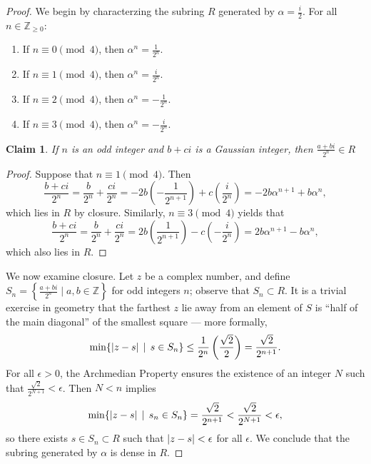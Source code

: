 \documentclass[11pt]{article}
\newtheorem{claim}{Claim}
\begin{document}
\begin{proof} 
  We begin by characterzing the subring $R$ generated by $\alpha = \tfrac{i}{2}$. For all $n \in \mathbb{Z}_{\ge 0}$:
    \begin{enumerate}
   \item If $n \equiv 0 \pmod{4}$, then $\alpha^{n} = \frac{1}{2^{n}}$.
    \item If $n \equiv 1 \pmod{4}$, then $\alpha^{n} = \frac{i}{2^{n}}$.
   \item If $n \equiv 2 \pmod{4}$, then $\alpha^{n} = - \frac{1}{2^{n}}$.
   \item If $n \equiv 3 \pmod{4}$, then $\alpha^{n} = - \frac{i}{2^{n}}$.
  \end{enumerate}
  
  \begin{claim}
    If $n$ is an odd integer and $b + ci$ is a Gaussian integer, then $\tfrac{a + bi}{2^{n}} \in R$
  \end{claim}
  \begin{adjustwidth}{1cm}{}
    \begin{proof}\renewcommand{\qedsymbol}{}
      Suppose that $n \equiv 1 \pmod{4}$. Then 
      \[
        \frac{b + ci}{2^{n}} = \frac{b}{2^{n}} + \frac{ci}{2^{n}} = - 2b \left( - \frac{1}{2^{n + 1}} \right) + c \left( \frac{i}{2^{n}} \right) = -2b \alpha^{n + 1} + b \alpha^{n},
      \]
      which lies in $R$ by closure. Similarly, $n \equiv 3 \pmod{4}$ yields that
     \[
        \frac{b + ci}{2^{n}} = \frac{b}{2^{n}} + \frac{ci}{2^{n}} = 2b \left( \frac{1}{2^{n + 1}} \right) - c \left( -\frac{i}{2^{n}} \right) = 2b \alpha^{n + 1} - b \alpha^{n},
     \]
     which also lies in $R$.
   \end{proof}
  \end{adjustwidth}
  
We now examine closure. Let $z$ be a complex number, and define $S_{n} = \left\{ \tfrac{a + bi}{2^{n}} \mid a, b \in \mathbb{Z} \right\}$ for odd integers $n$; observe that $S_{n} \subset R$. It is a trivial exercise in geometry that the farthest $z$ lie away from an element of $S$ is ``half of the main diagonal'' of the smallest square --- more formally,
  \[
    \min \{ \abs{z - s} \, \mid \, s \in S_{n} \} \le \frac{1}{2^{n}} \left( \frac{\sqrt{2}}{2} \right) = \frac{\sqrt{2}}{2^{n + 1}}.
  \]
  For all $\epsilon > 0$, the Archmedian Property ensures the existence of an integer $N$ such that $\tfrac{\sqrt{2}}{2^{N + 1}} < \epsilon$. Then $N < n$ implies
  \[
    \min \{ \abs{z - s} \, \mid \, s_{n} \in S_{n} \} = \frac{\sqrt{2}}{2^{n + 1}} < \frac{\sqrt{2}}{2^{N + 1}} < \epsilon,
  \]
  so there exists $s \in S_{n} \subset R$ such that $\abs{z - s} < \epsilon$ for all $\epsilon$. We conclude that the subring generated by $\alpha$ is dense in $R$.
\end{proof}
\end{document}
